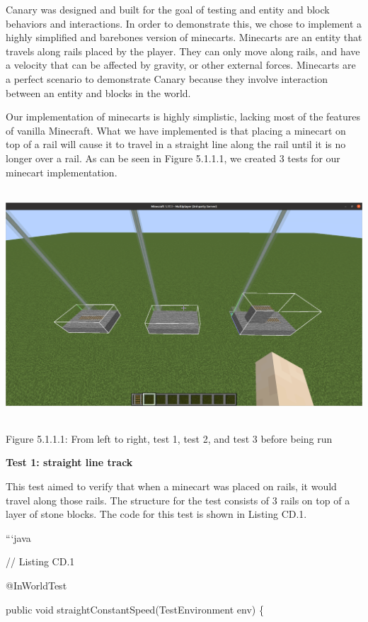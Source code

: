 \documentclass{article}
\begin{document}
\begin{onehalfspacing}
Canary was designed and built for the goal of testing and entity and
block behaviors and interactions. In order to demonstrate this, we chose
to implement a highly simplified and barebones version of minecarts.
Minecarts are an entity that travels along rails placed by the player.
They can only move along rails, and have a velocity that can be affected
by gravity, or other external forces. Minecarts are a perfect scenario
to demonstrate Canary because they involve interaction between an entity
and blocks in the world.

Our implementation of minecarts is highly simplistic, lacking most of
the features of vanilla Minecraft. What we have implemented is that
placing a minecart on top of a rail will cause it to travel in a
straight line along the rail until it is no longer over a rail. As can
be seen in Figure 5.1.1.1, we created 3 tests for our minecart
implementation.

\includegraphics[width=6.14063in,height=3.37538in]{media/media/image15.png}

Figure 5.1.1.1: From left to right, test 1, test 2, and test 3 before
being run

\textbf{Test 1: straight line track}

This test aimed to verify that when a minecart was placed on rails, it
would travel along those rails. The structure for the test consists of 3
rails on top of a layer of stone blocks. The code for this test is shown
in Listing CD.1.

```java

// Listing CD.1

@InWorldTest

public void straightConstantSpeed(TestEnvironment env) \{


\end{onehalfspacing}
\end{document}
